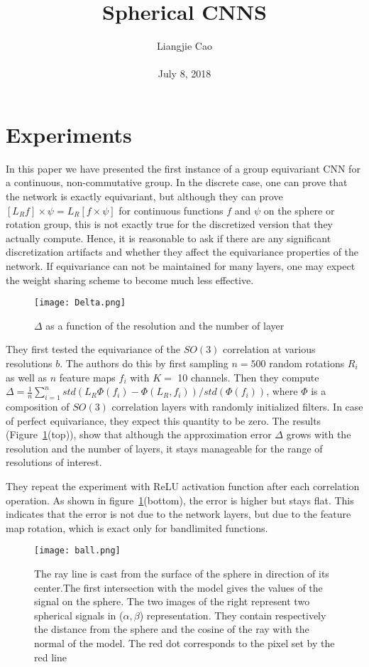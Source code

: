 \documentclass[10pt,twocolumn,letterpaper]{article}
\begin{document}
\title{\textbf{Spherical CNNS
}}
\author{Liangjie Cao\\\\ July 8, 2018}
\maketitle
\section{Experiments}
In this paper we have presented the first instance of a group equivariant CNN for a continuous, non-commutative group. In the discrete case, one can prove that the network is
exactly equivariant, but although they can prove
$[L_{R}f]\times\psi=L_R[f\times\psi]$ for continuous functions
$f$ and $\psi$ on the sphere or rotation group, this is
not exactly true for the discretized version that they actually compute. Hence, it is reasonable to ask if there are any significant discretization artifacts and whether they affect the equivariance properties of the network. If equivariance can
not be maintained for many layers, one may expect the weight sharing scheme to become much
less effective.
\begin{figure}
\centering
\texttt{[image: Delta.png]}
\caption{$\Delta$ as a function of the resolution and the number of layer}
\label{Fig1}
\end{figure}
\par They first tested the equivariance of the $SO(3)$ correlation at various resolutions $b$. The authors do this by first sampling $n=500$ random rotations $R_i$ as well as $n$ feature maps $f_i$ with $K=$ 10 channels. Then they compute $\Delta=\frac{1}{n}\sum_{i=1}^{n}std(L_{R}\Phi(f_i)-\Phi(L_R,f_i))/std(\Phi(f_i))$, where $\Phi$ is a composition of $SO(3)$ correlation layers with randomly initialized filters. In case of perfect equivariance, they expect this quantity to be zero. The results (Figure~\ref{Fig1}(top)), show that although the approximation error $\Delta$ grows with the resolution and the number of layers, it stays manageable for the range of resolutions of interest.
\par They repeat the experiment with ReLU activation function after each correlation operation. As shown in figure~\ref{Fig1}(bottom), the error is higher but stays flat. This indicates that the error is not due to the network layers, but due to the feature map rotation, which is exact only for bandlimited functions.
\begin{figure}
\centering
\texttt{[image: ball.png]}
\caption{The ray line is cast from the surface of the sphere in direction of its center.The first intersection with the model gives the values of the signal on the sphere. The two images of the right represent two spherical signals in ($\alpha,\beta$) representation. They contain respectively the distance from the sphere and the cosine of the ray with the normal of the model. The red dot corresponds to the pixel set by the red line}
\label{Fig3}
\end{figure}
\end{document}
